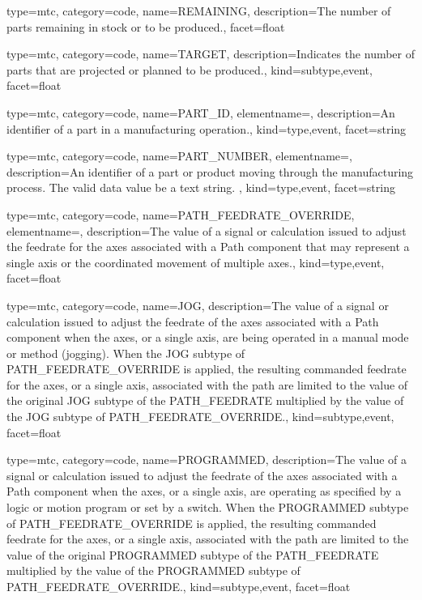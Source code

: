 {
  type=mtc,
  category=code,
  name={REMAINING},
  description={The number of parts remaining in stock or to be produced.},
  facet={\gls{float}}
}


{
  type=mtc,
  category=code,
  name={TARGET},
  description={Indicates the number of parts that are projected or planned to be produced.},
  kind={subtype,event},
  facet={\gls{float}}
}


{
  type=mtc,
  category=code,
  name={PART\_ID},
  elementname=,
  description={An identifier of a part in a manufacturing operation.},
  kind={type,event},
  facet={\gls{string}}
}


{
  type=mtc,
  category=code,
  name={PART\_NUMBER},
  elementname=,
  description={An identifier of a part or product moving through the manufacturing process.  The \gls{valid data value} \must be a text string. },
  kind={type,event},
  facet={\gls{string}}
}


{
  type=mtc,
  category=code,
  name={PATH\_FEEDRATE\_OVERRIDE},
  elementname=,
  description={The value of a signal or calculation issued to adjust the feedrate for the axes associated with a Path component that may represent a single axis or the coordinated movement of multiple axes.},
  kind={type,event},
  facet={\gls{float}}
}


{
  type=mtc,
  category=code,
  name={JOG},
  description={The value of a signal or calculation issued to adjust the feedrate of the axes associated with a Path component when the axes, or a single axis, are being operated in a manual mode or method (jogging).   \newline When the JOG subtype of PATH\_FEEDRATE\_OVERRIDE is applied, the resulting commanded feedrate for the axes, or a single axis, associated with the path are limited to the value of the original JOG subtype of the PATH\_FEEDRATE multiplied by the value of the JOG subtype of PATH\_FEEDRATE\_OVERRIDE.},
  kind={subtype,event},
  facet={\gls{float}}
}


{
  type=mtc,
  category=code,
  name={PROGRAMMED},
  description={The value of a signal or calculation issued to adjust the feedrate of the axes associated with a Path component when the axes, or a single axis, are operating as specified by a logic or motion program or set by a switch. \newline When the PROGRAMMED subtype of PATH\_FEEDRATE\_OVERRIDE is applied, the resulting commanded feedrate for the axes, or a single axis, associated with the path are limited to the value of the original PROGRAMMED subtype of the PATH\_FEEDRATE multiplied by the value of the PROGRAMMED subtype of PATH\_FEEDRATE\_OVERRIDE.},
  kind={subtype,event},
  facet={\gls{float}}
}


